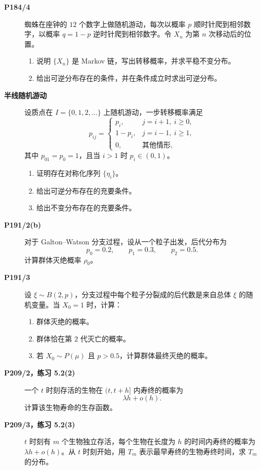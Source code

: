 \documentclass[12pt,a4paper,openany]{ctexrep}
\theoremstyle{definition}
\begin{document}
\begin{description}
	\item[\textbf{P184/4}] 蜘蛛在座钟的 $12$ 个数字上做随机游动，每次以概率 $p$ 顺时针爬到相邻数字，以概率 $q=1-p$ 逆时针爬到相邻数字。令 $X_n$ 为第 $n$ 次移动后的位置。
	\begin{enumerate}[label=(\arabic*)]
		\item 说明 $\{X_n\}$ 是 Markov 链，写出转移概率，并求平稳不变分布。
		\item 给出可逆分布存在的条件，并在条件成立时求出可逆分布。
	\end{enumerate}
	\item[\textbf{半线随机游动}] 设质点在 $I=\{0,1,2,\dots\}$ 上随机游动，一步转移概率满足
	\[
	p_{ij}=
	\begin{cases}
	p_i,&j=i+1,\ i\ge0,\\
	1-p_i,&j=i-1,\ i\ge1,\\
	0,&\text{其他情形},
	\end{cases}
	\]
	其中 $p_{01}=p_0=1$，且当 $i>1$ 时 $p_i\in(0,1)$。
	\begin{enumerate}[label=(\arabic*)]
		\item 证明存在对称化序列 $\{\eta_i\}$。
		\item 给出可逆分布存在的充要条件。
		\item 给出不变分布存在的充要条件。
	\end{enumerate}
	\item[\textbf{P191/2(b)}] 对于 Galton--Watson 分支过程，设从一个粒子出发，后代分布为
	\[
	p_0=0.2,\qquad p_1=0.3,\qquad p_2=0.5.
	\]
	计算群体灭绝概率 $\rho_0$。
	\item[\textbf{P191/3}] 设 $\xi\sim B(2,p)$，分支过程中每个粒子分裂成的后代数是来自总体 $\xi$ 的随机变量。当 $X_0=1$ 时，计算：
	\begin{enumerate}[label=(\arabic*)]
		\item 群体灭绝的概率。
		\item 群体恰在第 $2$ 代灭亡的概率。
		\item 若 $X_0\sim P(\mu)$ 且 $p>0.5$，计算群体最终灭绝的概率。
	\end{enumerate}
	\item[\textbf{P209/2，练习 5.2(2)}] 一个 $t$ 时刻存活的生物在 $(t,t+h]$ 内寿终的概率为
	\[
	\lambda h+o(h).
	\]
	计算该生物寿命的生存函数。
	\item[\textbf{P209/3，练习 5.2(3)}] $t$ 时刻有 $m$ 个生物独立存活，每个生物在长度为 $h$ 的时间内寿终的概率为 $\lambda h+o(h)$。从 $t$ 时刻开始，用 $T_m$ 表示最早寿终的生物寿终时间，求 $T_m$ 的分布。
\end{description}
\end{document}
